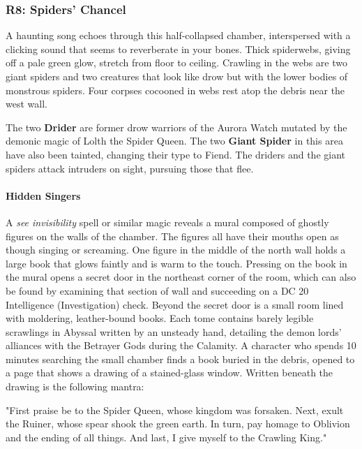 \documentclass[10pt,a4,twoside,twocolumn,openany,nodeprecatedcode]{dndbook}
\begin{document}
\subsubsection{R8: Spiders' Chancel}
\begin{DndReadAloud}{}
A haunting song echoes through this half-collapsed chamber, interspersed with a clicking sound that seems to reverberate in your bones. Thick spiderwebs, giving off a pale green glow, stretch from floor to ceiling. Crawling in the webs are two giant spiders and two creatures that look like drow but with the lower bodies of monstrous spiders. Four corpses cocooned in webs rest atop the debris near the west wall.
\end{DndReadAloud}

The two \textbf{Drider} are former drow warriors of the Aurora Watch mutated by the demonic magic of Lolth the Spider Queen. The two \textbf{Giant Spider} in this area have also been tainted, changing their type to Fiend.
The driders and the giant spiders attack intruders on sight, pursuing those that flee.
\paragraph{Hidden Singers}
A \textit{see invisibility} spell or similar magic reveals a mural composed of ghostly figures on the walls of the chamber. The figures all have their mouths open as though singing or screaming. One figure in the middle of the north wall holds a large book that glows faintly and is warm to the touch. Pressing on the book in the mural opens a secret door in the northeast corner of the room, which can also be found by examining that section of wall and succeeding on a DC 20 Intelligence (Investigation) check. Beyond the secret door is a small room lined with moldering, leather-bound books. Each tome contains barely legible scrawlings in Abyssal written by an unsteady hand, detailing the demon lords' alliances with the Betrayer Gods during the Calamity.
A character who spends 10 minutes searching the small chamber finds a book buried in the debris, opened to a page that shows a drawing of a stained-glass window. Written beneath the drawing is the following mantra:
\begin{DndReadAloud}{}
"First praise be to the Spider Queen, whose kingdom was forsaken. Next, exult the Ruiner, whose spear shook the green earth. In turn, pay homage to Oblivion and the ending of all things. And last, I give myself to the Crawling King."
\end{DndReadAloud}
\end{document}
